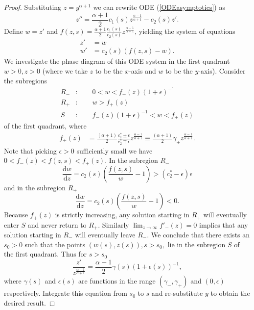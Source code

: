 \documentclass{amsart}
\theoremstyle{definition}
\theoremstyle{remark}
\numberwithin{equation}{section}
\begin{document}
\begin{proof}
Substituting $z = y^{\alpha+1}$ we can rewrite ODE (\ref{ODEasymptotics}) as
\begin{equation*}
z'' = \frac{\alpha+1}{2} c_1(s) z^{\frac{\alpha-1}{\alpha+1}} - c_2(s)z'.
\end{equation*}
Define $w = z'$ and $f(z,s) = \frac{\alpha+1}{2} \frac{c_1(s)}{c_2(s)} z^{\frac{\alpha-1}{\alpha+1}}$, yielding the system of equations
\begin{align*}
z' &= w \\
w' &= c_2(s) \left(f(z,s)-w\right).  
\end{align*}
We investigate the phase diagram of this ODE system in the first quadrant $w>0 , z>0$ (where we take $z$ to be the $x$-axis and $w$ to be the $y$-axis).  Consider the subregions 
\begin{align*}
R_-&: \qquad 0 < w < f_-(z) (1 + \epsilon)^{-1} \\
R_+&:\qquad    w > f_+(z) \\
S&:\qquad  f_-(z) (1 + \epsilon)^{-1} < w < f_+(z)
\end{align*}
of the first quadrant, where
\begin{align*}
f_{\pm}(z) & = \frac{(\alpha+1)}{2} \frac{c_1^{\ast} \pm \epsilon}{c_2^{\ast}\mp\epsilon} z^{\frac{\alpha-1}{\alpha+1}} \equiv \frac{(\alpha+1)}{2} \gamma_{\pm} z^{\frac{\alpha-1}{\alpha+1}}.
\end{align*}
Note that picking $\epsilon>0$ sufficiently small we have $0<f_-(z) < f(z,s) < f_+(z)$. In the subregion $R_-$
\begin{equation*}
\frac{\mathrm{d}w}{\mathrm{d}z} = c_2(s) \left( \frac{f(z,s)}{w} -1 \right)> \left(c_2^{\ast} - \epsilon\right) \epsilon
\end{equation*}
and in the subregion $R_+$
\begin{equation*}
\frac{\mathrm{d}w}{\mathrm{d}z} = c_2(s) \left( \frac{f(z,s)}{w} -1 \right)<0.
\end{equation*}
Because $f_+(z)$ is strictly increasing, any solution starting in $R_+$ will eventually enter $S$ and never return to $R_+$. Similarly $\lim_{ z \rightarrow \infty} f'_-(z) = 0$ implies that any solution starting in $R_-$ will eventually leave $R_-$. We conclude that there exists an $s_0>0$ such that the points $(w(s), z(s)), s > s_0,$ lie in the subregion $S$ of the first quadrant. Thus for $s>s_0$
\begin{equation}
\label{eqn:asymptotics-derivative}
\frac{z'}{z^{\frac{\alpha-1}{\alpha+1}}}  = \frac{\alpha+1}{2}\gamma(s)\left(1 + \epsilon(s)\right)^{-1},
\end{equation}
where $\gamma(s)$ and $\epsilon(s)$ are functions in the range $(\gamma_- , \gamma_+)$ and $(0,\epsilon)$ respectively. Integrate this equation from $s_0$ to $s$ and re-substitute $y$ to obtain the desired result.
\end{proof}
\end{document}
